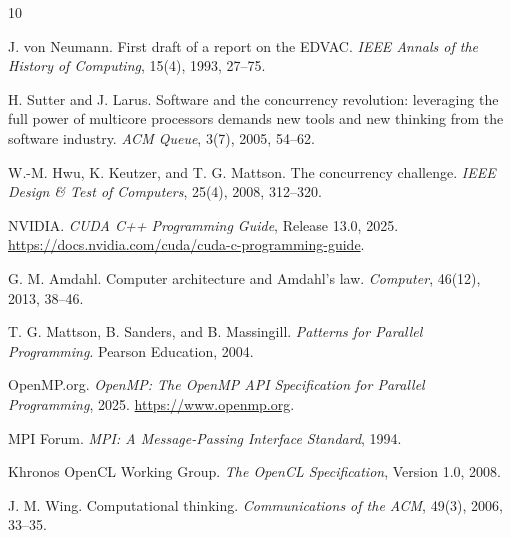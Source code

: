 \begin{chapterbibliography}{10}

J. von Neumann.
First draft of a report on the EDVAC.
\emph{IEEE Annals of the History of Computing}, 15(4), 1993, 27--75.

H. Sutter and J. Larus.
Software and the concurrency revolution: leveraging the full power of multicore
processors demands new tools and new thinking from the software industry.
\emph{ACM Queue}, 3(7), 2005, 54--62.

W.-M. Hwu, K. Keutzer, and T. G. Mattson.
The concurrency challenge.
\emph{IEEE Design \& Test of Computers}, 25(4), 2008, 312--320.

NVIDIA.
\emph{CUDA C++ Programming Guide}, Release 13.0, 2025.
\url{https://docs.nvidia.com/cuda/cuda-c-programming-guide}.

G. M. Amdahl.
Computer architecture and Amdahl's law.
\emph{Computer}, 46(12), 2013, 38--46.

T. G. Mattson, B. Sanders, and B. Massingill.
\emph{Patterns for Parallel Programming}.
Pearson Education, 2004.

OpenMP.org.
\emph{OpenMP: The OpenMP API Specification for Parallel Programming}, 2025.
\url{https://www.openmp.org}.

MPI Forum.
\emph{MPI: A Message-Passing Interface Standard}, 1994.

Khronos OpenCL Working Group.
\emph{The OpenCL Specification}, Version 1.0, 2008.

J. M. Wing.
Computational thinking.
\emph{Communications of the ACM}, 49(3), 2006, 33--35.

\end{chapterbibliography}
